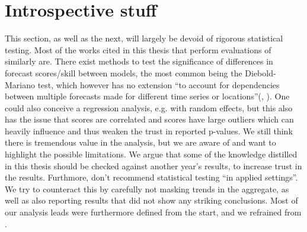 \section{Introspective stuff}
This section, as well as the next, will largely be devoid of rigorous statistical testing. Most of the works cited in this thesis that perform evaluations of similarly are. There exist methods to test the significance of differences in forecast scores/skill between models, the most common being the Diebold-Mariano test, which however has no extension ``to account for dependencies between multiple forecasts made for different time series or locations''(\cite{bracher_evaluating_2021}, \cite{diebold_comparing_1995}). One could also conceive a regression analysis, e.g. with random effects, but this also has the issue that scores are correlated and scores have large outliers which can heavily influence and thus weaken the trust in reported p-values. We still think there is tremendous value in the analysis, but we are aware of and want to highlight the possible limitations. We argue that some of the knowledge distilled in this thesis should be checked against another year's results, to increase trust in the results. Furthmore, \cite{bosse_epiforecastsscoringutils_2022} don't recommend statistical testing ``in applied settings''.\\ 
We try to counteract this by carefully not masking trends in the aggregate, as well as also reporting results that did not show any striking conclusions. Most of our analysis leads were furthermore defined from the start, and we refrained from .\\
